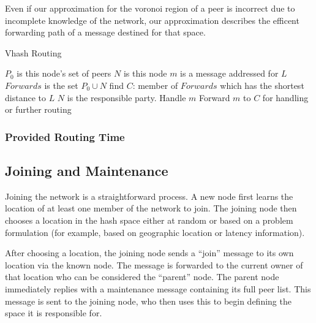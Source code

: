 \documentclass{IEEEtran}
\begin{document}
Even if our approximation for the voronoi region of a peer is incorrect due to incomplete knowledge of the network, our approximation describes the efficent forwarding path of a message destined for that space.

\begin{algorithm}
\caption{Vhash Routing}
\label{routing}
\begin{algorithmic}[1]  %
	\STATE $P_0$ is this node's set of peers
    \STATE $N$ is this node
	\STATE $m$ is a message addressed for $L$
    \STATE $Forwards$ is the set $P_0\cup{}N$
    \STATE find $C$: member of $Forwards$ which has the shortest distance to $L$
    	\STATE $N$ is the responsible party.
        \STATE Handle $m$
    \ELSE
    	\STATE Forward $m$ to $C$ for handling or further routing
    \ENDIF
\end{algorithmic}
\end{algorithm}


\subsubsection{Provided Routing Time}




\subsection{Joining and Maintenance}
Joining the network is a straightforward process. A new node first learns the location of at least one member of the network to join. The joining node then chooses a location in the hash space either at random or based on a problem formulation (for example, based on geographic location or latency information).

After choosing a location, the joining node sends a ``join'' message to its own location via the known node.
The message is forwarded to the current owner of that location who can be considered the ``parent'' node.
The parent node immediately replies with a maintenance message containing its full peer list. This message is sent to the joining node, who then uses this to begin defining the space it is responsible for. 
\end{document}
